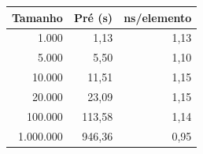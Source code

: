 \begin{tabular}{rrr}
\hline
\textbf{Tamanho} & \textbf{Pré (\textmu{}s)} & \textbf{ns/elemento} \\
\hline
1.000 & 1{,}13 & 1{,}13 \\
5.000 & 5{,}50 & 1{,}10 \\
10.000 & 11{,}51 & 1{,}15 \\
20.000 & 23{,}09 & 1{,}15 \\
100.000 & 113{,}58 & 1{,}14 \\
1.000.000 & 946{,}36 & 0{,}95 \\
\hline
\end{tabular}
